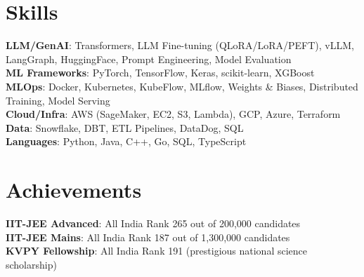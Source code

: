 \documentclass[letterpaper,11pt]{article}
\begin{document}
\section{Skills}
 \begin{itemize}[leftmargin=0.15in, label={}]
    \small{\item{
     \textbf{LLM/GenAI}{: Transformers, LLM Fine-tuning (QLoRA/LoRA/PEFT), vLLM, LangGraph, HuggingFace, Prompt Engineering, Model Evaluation} \\
     \textbf{ML Frameworks}{: PyTorch, TensorFlow, Keras, scikit-learn, XGBoost} \\
     \textbf{MLOps}{: Docker, Kubernetes, KubeFlow, MLflow, Weights \& Biases, Distributed Training, Model Serving} \\
     \textbf{Cloud/Infra}{: AWS (SageMaker, EC2, S3, Lambda), GCP, Azure, Terraform} \\
     \textbf{Data}{: Snowflake, DBT, ETL Pipelines, DataDog, SQL} \\
     \textbf{Languages}{: Python, Java, C++, Go, SQL, TypeScript}
    }}
 \end{itemize}

\section{Achievements}
 \begin{itemize}[leftmargin=0.15in, label={}]
    \small{\item{
     \textbf{IIT-JEE Advanced}{: All India Rank 265 out of 200,000 candidates} \\
     \textbf{IIT-JEE Mains}{: All India Rank 187 out of 1,300,000 candidates} \\
     \textbf{KVPY Fellowship}{: All India Rank 191 (prestigious national science scholarship)}
    }}
 \end{itemize}
\end{document}
